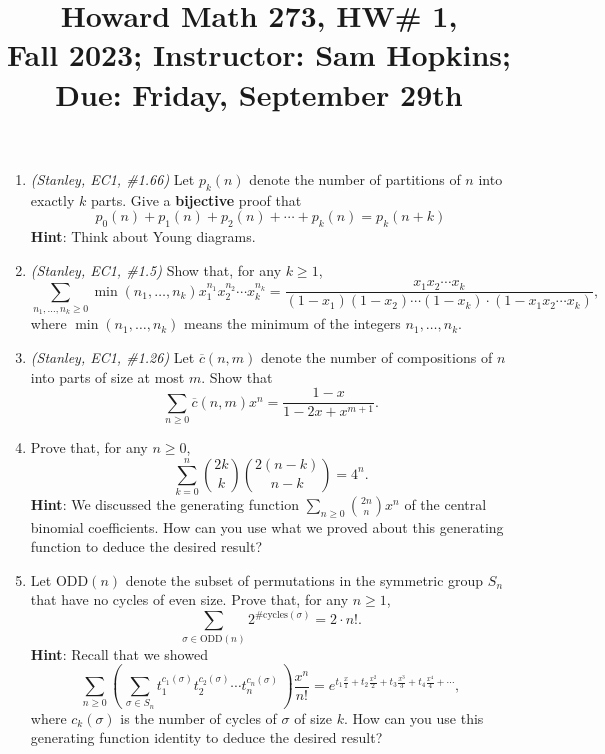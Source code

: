 \documentclass[11pt]{article}
\title{Howard Math 273, HW\# 1, \\ {\normalsize Fall 2023; Instructor: Sam Hopkins; Due: Friday, September 29th}}
\date{}
\begin{document}
\maketitle

\thispagestyle{empty}

\begin{enumerate}

\item \emph{(Stanley, EC1, \#1.66)} Let $p_k(n)$ denote the number of partitions of $n$ into exactly $k$ parts. Give a {\bf bijective} proof that
\[p_0(n)+p_1(n)+p_2(n)+\cdots + p_k(n) = p_k(n+k)\]
{\bf Hint}: Think about Young diagrams.

\item \emph{(Stanley, EC1, \#1.5)} Show that, for any $k \geq 1$,
\[ \sum_{n_1,\ldots, n_k \geq 0} \min(n_1,\ldots,n_k) x_1^{n_1}x_2^{n_2}\cdots x_k^{n_k} = \frac{x_1x_2\cdots x_k}{(1-x_1)(1-x_2)\cdots(1-x_k) \cdot (1-x_1x_2\cdots x_k)}, \]
where $ \min(n_1,\ldots,n_k)$ means the minimum of the integers $n_1,\ldots,n_k$.

\item \emph{(Stanley, EC1, \#1.26)} Let $\overline{c}(n,m)$ denote the number of compositions of $n$ into parts of size at most $m$. Show that
\[ \sum_{n\geq 0} \overline{c}(n,m)x^n = \frac{1-x}{1-2x+x^{m+1}}.\]

\item Prove that, for any $n \geq 0$,
\[ \sum_{k=0}^{n} \binom{2k}{k}\binom{2(n-k)}{n-k} = 4^n. \]
{\bf Hint}: We discussed the generating function $\sum_{n\geq 0} \binom{2n}{n}x^n$ of the central binomial coefficients. How can you use what we proved about this generating function to deduce the desired result?

\item Let $\mathrm{ODD}(n)$ denote the subset of permutations in the symmetric group $S_n$ that have no cycles of even size. Prove that, for any $n \geq 1$,
\[ \sum_{\sigma \in \mathrm{ODD}(n)} 2^{\#\mathrm{cycles}(\sigma)} = 2\cdot n!. \]
{\bf Hint}: Recall that we showed
\[ \sum_{n \geq 0}  \left( \, \sum_{\sigma\in S_n} t_1^{c_1(\sigma)} t_2^{c_2(\sigma)} \cdots t_n^{c_n(\sigma)} \, \right)  \frac{x^n}{n!} = e^{t_1 \frac{x}{1} + t_2\frac{x^2}{2} + t_3\frac{x^3}{3} + t_4\frac{x^4}{4} + \cdots},\]
where $c_k(\sigma)$ is the number of cycles of $\sigma$ of size $k$. How can you use this generating function identity to deduce the desired result?


\end{enumerate}
\end{document}
